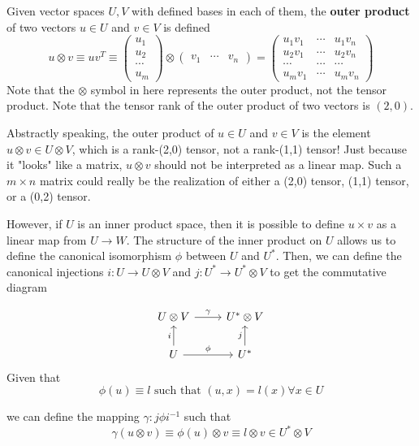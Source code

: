  \begin{definition}
    Given vector spaces $U, V$ with defined bases in each of them, the \textbf{outer product} of two vectors $u \in U$ and $v \in V$ is defined
    \[u \otimes v \equiv u v^T \equiv \begin{pmatrix}
    u_1 \\ u_2 \\ \cdots \\ u_m
    \end{pmatrix} \otimes \begin{pmatrix}
    v_1 & \cdots & v_n
    \end{pmatrix} = \begin{pmatrix}
    u_1 v_1 & \cdots & u_1 v_n \\
    u_2 v_1 & \cdots & u_2 v_n \\
    \cdots & \cdots & \cdots \\
    u_m v_1 & \cdots & u_m v_n 
    \end{pmatrix}\]
    Note that the $\otimes$ symbol in here represents the outer product, not the tensor product. Note that the tensor rank of the outer product of two vectors is $(2,0)$. 
  \end{definition}

  Abstractly speaking, the outer product of $u \in U$ and $v \in V$ is the element $u \otimes v \in U \otimes V$, which is a rank-(2,0) tensor, not a rank-(1,1) tensor! Just because it "looks" like a matrix, $u \otimes v$ should not be interpreted as a linear map. Such a $m \times n$ matrix could really be the realization of either a (2,0) tensor, (1,1) tensor, or a (0,2) tensor. 

  However, if $U$ is an inner product space, then it is possible to define $u \times v$ as a linear map from $U \longrightarrow W$. The structure of the inner product on $U$ allows us to define the canonical isomorphism $\phi$ between $U$ and $U^*$. Then, we can define the canonical injections $i: U \longrightarrow U \otimes V$ and $j: U^* \longrightarrow U^* \otimes V$ to get the commutative diagram 

  \[\begin{tikzcd}
      U \otimes V \arrow{r}{\gamma} & U^* \otimes V \\
      U \arrow{u}{i} \arrow{r}{\phi} & U^* \arrow{u}{j}
  \end{tikzcd}\]
  Given that 
  \[\phi(u) \equiv l \text{ such that } (u, x) = l(x) \forall x \in U\]

  we can define the mapping $\gamma: j \phi i^{-1}$ such that 
  \[\gamma (u \otimes v) \equiv \phi(u) \otimes v \equiv l \otimes v \in U^* \otimes V\]

